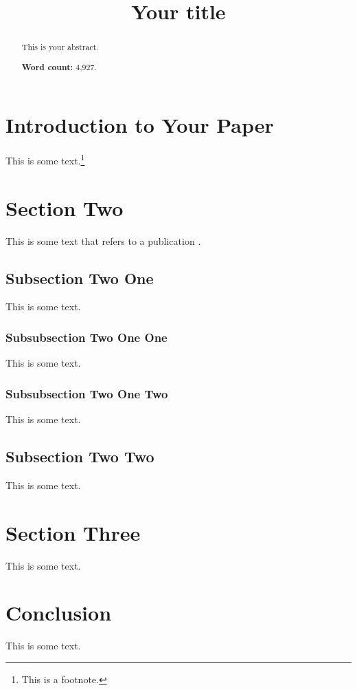 \documentclass[12pt,english]{article}
\begin{document}
\title{Your title}
\author{}

\date{}

\maketitle

\thispagestyle{empty}

\begin{abstract}
This is your abstract. \\[12pt]
\begin{center}\textbf{Word count:} 4,927.\end{center}
\end{abstract}

\pagebreak

\section{Introduction to Your Paper}

This is some text.\footnote{This is a footnote.}

\section{Section Two}

This is some text that refers to a publication \citep{hempel1948}.

\subsection{Subsection Two One}

This is some text.

\subsubsection{Subsubsection Two One One}

This is some text.

\subsubsection{Subsubsection Two One Two}

This is some text.

\subsection{Subsection Two Two}

This is some text.

\section{Section Three}

This is some text.

\section{Conclusion}

This is some text.

\pagebreak


{}
\end{document}
